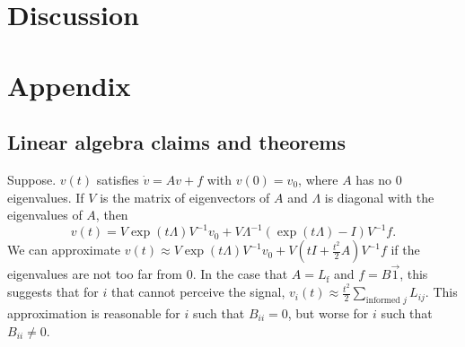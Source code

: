 \documentclass{article}
\begin{document}
\section{Discussion}
%
%


\newpage
\section{Appendix}

\subsection{Linear algebra claims and theorems }

\begin{claim} 
\label{exp_approx}
Suppose. $v(t)$ satisfies $\dot{v}=Av+f$ with $v(0)=v_0$, where $A$ has no $0$ eigenvalues. If $V$ is the matrix of eigenvectors of $A$ and $\Lambda$ is diagonal with the eigenvalues of $A$, then
\begin{equation} \label{diffeq_solution}
v(t)=V\exp(t\Lambda)V^{-1}v_0+V\Lambda^{-1}(\exp(t\Lambda)-I)V^{-1}f.
\end{equation}
We can approximate $v(t)\approx V\exp(t\Lambda)V^{-1}v_0+V(tI+\frac{t^2}{2}A)V^{-1}f$ if the eigenvalues are not too far from $0$. In the case that $A=L_\text{f}$ and $f=B\vec{1}$, this suggests that for $i$ that cannot perceive the signal, $v_i(t)\approx \frac{t^2}{2}\sum_{\text{informed }j }L_{ij}.$ This approximation is reasonable for $i$ such that $B_{ii}=0$, but worse for $i$ such that $B_{ii}\neq 0$. 
\end{claim}
\end{document}

